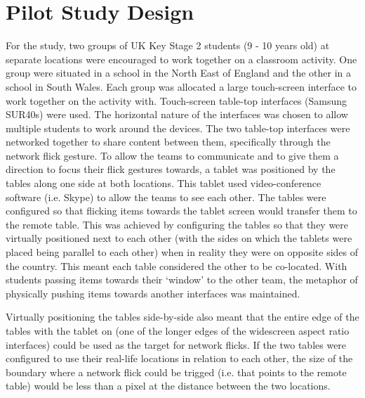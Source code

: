\documentclass[a4paper,11pt]{article}
\begin{document}
\section{Pilot Study Design}

For the study, two groups of UK Key Stage 2 students (9 - 10 years old) at separate locations were encouraged to work together on a classroom activity.
One group were situated in a school in the North East of England and the other in a school in South Wales.
Each group was allocated a large touch-screen interface to work together on the activity with.
Touch-screen table-top interfaces (Samsung SUR40s) were used.
The horizontal nature of the interfaces was chosen to allow multiple students to work around the devices.
The two table-top interfaces were networked together to share content between them, specifically through the network flick gesture.
To allow the teams to communicate and to give them a direction to focus their flick gestures towards, a tablet was positioned by the tables along one side at both locations.
This tablet used video-conference software (i.e. Skype) to allow the teams to see each other.
The tables were configured so that flicking items towards the tablet screen would transfer them to the remote table.
This was achieved by configuring the tables so that they were virtually positioned next to each other (with the sides on which the tablets were placed being parallel to each other) when in reality they were on opposite sides of the country.
This meant each table considered the other to be co-located.
With students passing items towards their `window' to the other team, the metaphor of physically pushing items towards another interfaces was maintained.

Virtually positioning the tables side-by-side also meant that the entire edge of the tables with the tablet on (one of the longer edges of the widescreen aspect ratio interfaces) could be used as the target for network flicks.
If the two tables were configured to use their real-life locations in relation to each other, the size of the boundary where a network flick could be trigged (i.e. that points to the remote table) would be less than a pixel at the distance between the two locations.
\end{document}
